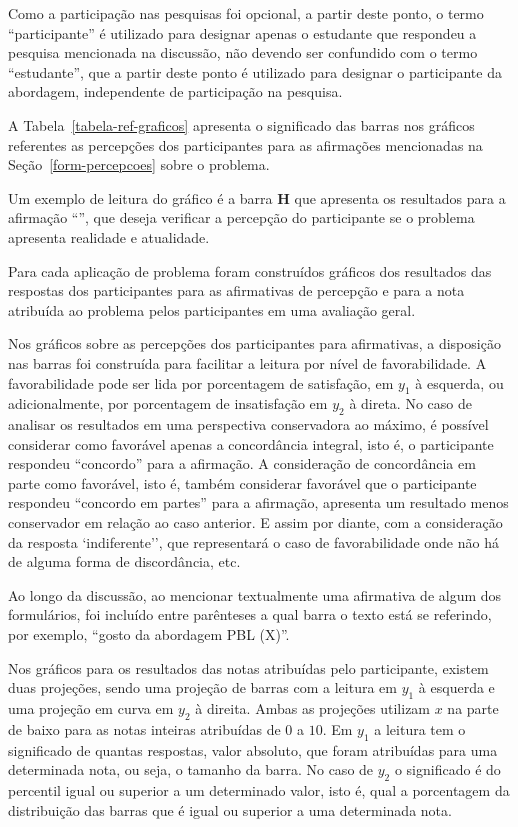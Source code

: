 Como a participação nas pesquisas foi opcional, a partir deste ponto, 
o termo  ``participante'' é utilizado para designar apenas 
o estudante que respondeu a pesquisa mencionada na discussão,
não devendo ser confundido com o termo ``estudante'', que a partir deste ponto
é utilizado para designar o participante da abordagem, independente
de participação na pesquisa.

A Tabela~\ref{tabela-ref-graficos} apresenta o significado das barras
nos gráficos referentes as percepções dos participantes para as
afirmações mencionadas na Seção~\ref{form-percepcoes} sobre
o problema.



Um exemplo de leitura do gráfico é a barra \textbf{H} que apresenta
os resultados para a afirmação ``\LikertPH'', que deseja verificar
a percepção do participante se o problema apresenta realidade
e atualidade.

Para cada aplicação de problema foram construídos gráficos
dos resultados das respostas dos participantes para as afirmativas
de percepção e para a nota atribuída ao problema pelos
participantes em uma avaliação geral.


Nos gráficos sobre as percepções dos participantes
para afirmativas, a disposição nas barras
foi construída para facilitar a leitura por nível de favorabilidade.
A favorabilidade pode ser lida por porcentagem de satisfação,
em $y_1$ à esquerda, ou adicionalmente, por porcentagem de
insatisfação em $y_2$ à direta.
No caso de analisar os resultados em uma perspectiva conservadora ao máximo,
é possível considerar como favorável apenas a concordância
integral, isto é, o participante respondeu ``concordo'' para
a afirmação.
A consideração de concordância em parte como favorável,
isto é, também considerar favorável que
o participante respondeu ``concordo em partes'' para a afirmação,
apresenta um resultado menos conservador em relação ao caso anterior.
E assim por diante, com a consideração da resposta `indiferente'', que
representará o caso de favorabilidade onde não há de alguma forma de
discordância, etc.

Ao longo da discussão, ao mencionar textualmente uma afirmativa de
algum dos formulários, foi incluído entre parênteses a qual barra o texto
está se referindo, por exemplo, ``gosto da abordagem PBL (X)''.

Nos gráficos para os resultados das notas atribuídas pelo participante,
existem duas projeções, sendo uma projeção de barras com
a leitura em $y_1$ à esquerda e uma projeção em curva
em $y_2$ à direita.
Ambas as projeções utilizam $x$ na parte de baixo para as notas
inteiras atribuídas de $0$ a $10$.
Em $y_1$ a leitura tem o significado de quantas respostas, valor absoluto,
que foram atribuídas para uma determinada nota, ou seja,
o tamanho da barra.
No caso de $y_2$ o significado é do percentil igual ou superior
a um determinado valor, isto é,
qual a porcentagem da distribuição das barras que é igual ou superior
a uma determinada nota.

